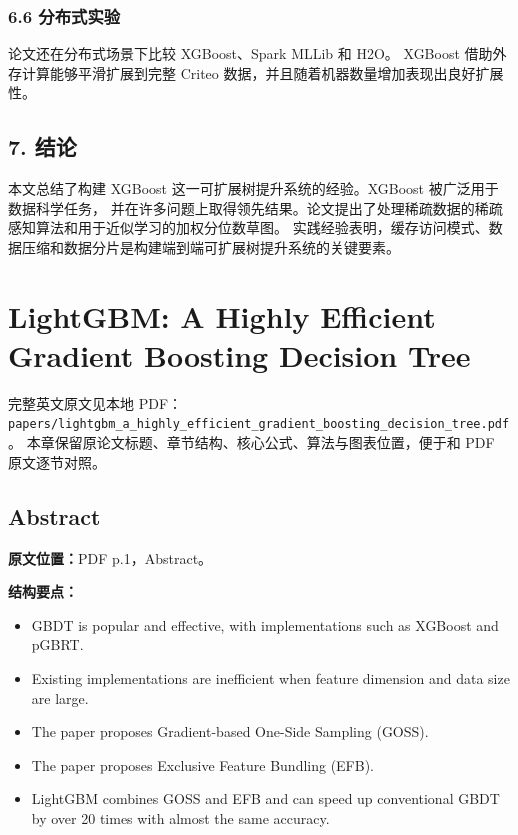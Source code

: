 \subsection{6.6 分布式实验}

论文还在分布式场景下比较 XGBoost、Spark MLLib 和 H2O。
XGBoost 借助外存计算能够平滑扩展到完整 Criteo 数据，并且随着机器数量增加表现出良好扩展性。

\section{7. 结论}

本文总结了构建 XGBoost 这一可扩展树提升系统的经验。XGBoost 被广泛用于数据科学任务，
并在许多问题上取得领先结果。论文提出了处理稀疏数据的稀疏感知算法和用于近似学习的加权分位数草图。
实践经验表明，缓存访问模式、数据压缩和数据分片是构建端到端可扩展树提升系统的关键要素。

\chapter{LightGBM: A Highly Efficient Gradient Boosting Decision Tree}

\begin{note}
完整英文原文见本地 PDF：
\texttt{papers/lightgbm\_a\_highly\_efficient\_gradient\_boosting\_decision\_tree.pdf}。
本章保留原论文标题、章节结构、核心公式、算法与图表位置，便于和 PDF 原文逐节对照。
\end{note}

\section{Abstract}

\textbf{原文位置：}PDF p.1，Abstract。

\textbf{结构要点：}
\begin{itemize}
  \item GBDT is popular and effective, with implementations such as XGBoost and pGBRT.
  \item Existing implementations are inefficient when feature dimension and data size are large.
  \item The paper proposes Gradient-based One-Side Sampling (GOSS).
  \item The paper proposes Exclusive Feature Bundling (EFB).
  \item LightGBM combines GOSS and EFB and can speed up conventional GBDT by over 20 times with almost the same accuracy.
\end{itemize}

